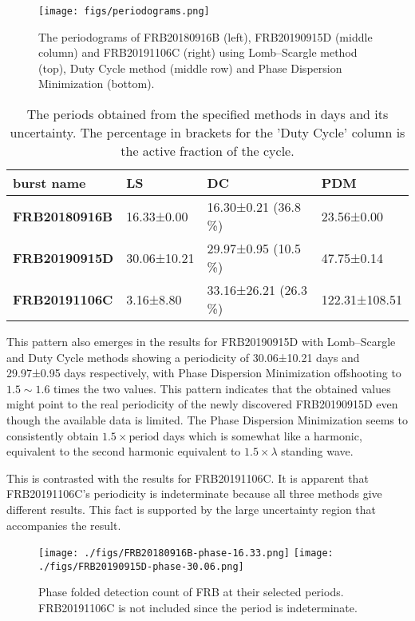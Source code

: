 \documentclass[reprint,amsmath,amssymb,showkeys,prd]{revtex4-2}
\begin{document}
\begin{figure}[ht]
    \label{fig-periodogram}
    \caption{
    The periodograms of FRB20180916B (left), FRB20190915D (middle column) and FRB20191106C (right) using Lomb--Scargle method (top), Duty Cycle method (middle row) and Phase Dispersion Minimization (bottom).
    }
    \centering
    \texttt{[image: figs/periodograms.png]}
\end{figure}

\begin{table}[!ht]
    \centering
    \caption{The periods obtained from the specified methods in days and its uncertainty. The percentage in brackets for the 'Duty Cycle' column is the active fraction of the cycle.}
    \begin{tabular}{l p{0.7in} p{0.7in} p{0.7in}}
    
    \hline
        \textbf{burst name} & \textbf{LS} & \textbf{DC} & \textbf{PDM} \\ \hline
        \textbf{FRB20180916B} & 16.33±0.00 & 16.30±0.21 (36.8 \%) & 23.56±0.00 \\ 
        \textbf{FRB20190915D} & 30.06±10.21 & 29.97±0.95 (10.5 \%) & 47.75±0.14 \\ 
        \textbf{FRB20191106C} & 3.16±8.80 & 33.16±26.21 (26.3 \%) & 122.31±108.51 \\ \hline
    \end{tabular}
    \label{tbl-result}
\end{table}

This pattern also emerges in the results for FRB20190915D with Lomb--Scargle and Duty Cycle methods showing a periodicity of 30.06±10.21 days and 29.97±0.95 days respectively, with Phase Dispersion Minimization offshooting to $1.5\sim 1.6$ times the two values.
This pattern indicates that the obtained values might point to the real periodicity of the newly discovered FRB20190915D even though the available data is limited.
The Phase Dispersion Minimization seems to consistently obtain $1.5 \times \text{period}$ days which is somewhat like a harmonic, equivalent to the second harmonic equivalent to $1.5\times \lambda$ standing wave. 

This is contrasted with the results for FRB20191106C.
It is apparent that FRB20191106C's periodicity is indeterminate because all three methods give different results.
This fact is supported by the large uncertainty region that accompanies the result. 

\begin{figure}[ht]
    \label{fig-fold}    
    \caption{Phase folded detection count of FRB at their selected periods. FRB20191106C is not included since the period is indeterminate.}
    \centering
        \texttt{[image: ./figs/FRB20180916B-phase-16.33.png]}
        \texttt{[image: ./figs/FRB20190915D-phase-30.06.png]}
\end{figure}
\end{document}
